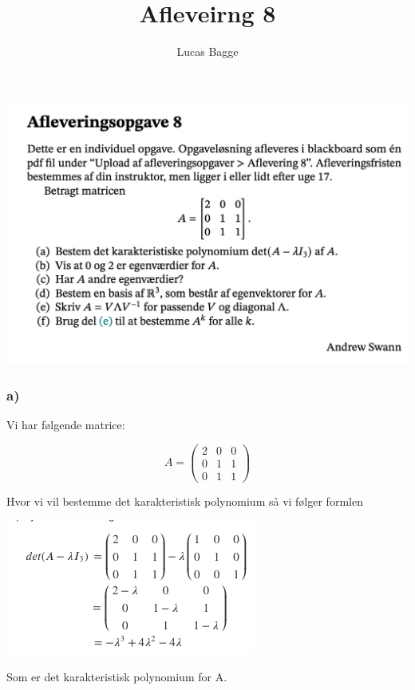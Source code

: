 \documentclass[
]{article}
\title{Afleveirng 8}
\subtitle{Lucas Bagge}
\author{}
\date{\vspace{-2.5em}}
\begin{document}
\maketitle

\includegraphics{na.alf.8.png}

\hypertarget{section}{%
\subsubsection{}\label{section}}

\hypertarget{a}{%
\subsubsection{a)}\label{a}}

Vi har følgende matrice:

\[
A=
\begin{pmatrix}
2&0&0\\
0&1&1\\
0&1&1
\end{pmatrix}
\]

Hvor vi vil bestemme det karakteristisk polynomium så vi følger formlen

\includegraphics{na.karak.png}

Som er det karakteristisk polynomium for A.
\end{document}
